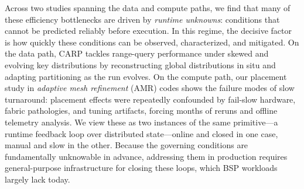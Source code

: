 Across two studies spanning the data and compute paths, we find that many of these efficiency
bottlenecks are driven by \emph{runtime unknowns}: conditions that cannot be predicted reliably
before execution.
In this regime, the decisive factor is how quickly these conditions can be observed, characterized,
and mitigated.
On the data path, CARP tackles range-query performance under skewed and evolving key distributions
by reconstructing global distributions in situ and adapting partitioning as the run evolves.
On the compute path, our placement study in \emph{adaptive mesh refinement} (AMR) codes shows
the failure modes of slow turnaround:
placement effects were repeatedly confounded by fail-slow hardware, fabric
pathologies, and tuning artifacts, forcing months of reruns and offline telemetry analysis.
We view these as two instances of the same primitive---a runtime feedback loop over distributed
state---online and closed in one case, manual and slow in the other.
Because the governing conditions are fundamentally unknowable in advance, addressing them in
production requires general-purpose infrastructure for closing these loops,
which BSP workloads largely lack today.



